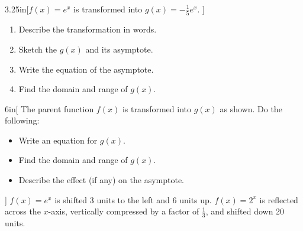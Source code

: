 \begin{myWideProblem}{3.25in}[$f(x) = e^x$ is transformed into $g(x)=-\frac{1}{5}e^{x} $. ]
    {
        \small
        \begin{minipage}{0.54\textwidth}
            \begin{enumerate}[nosep]
                \item Describe the transformation in words.
                \item Sketch the $g(x)$ and its asymptote.
            \end{enumerate}
        \end{minipage}
        \hfil
        \begin{minipage}{0.45\textwidth}
            \begin{enumerate}[nosep]
                \setcounter{enumi}{2}
                \item Write the equation of the asymptote.
                \item Find the domain and range of $g(x)$.
            \end{enumerate}
        \end{minipage}
    }
\end{myWideProblem}


\begin{my2Problems}{6in}[%
        The parent function $f(x)$ is transformed into $g(x)$ as shown.
        Do the following:\vspace{-\onelineskip}
        \begin{itemize}[nosep]
            \item Write an equation for $g(x)$.
            \item Find the domain and range of $g(x)$.
            \item Describe the effect (if any) on the asymptote.
        \end{itemize}
    ]
    {
        $f(x) = e^x$ is shifted 3 units to the left and 6 units up.
    }
    {
        $f(x) = 2^x$ is reflected across the $x$-axis, vertically compressed by a factor of $\frac{1}{3}$,
        and shifted down 20 units.
    }
\end{my2Problems}
